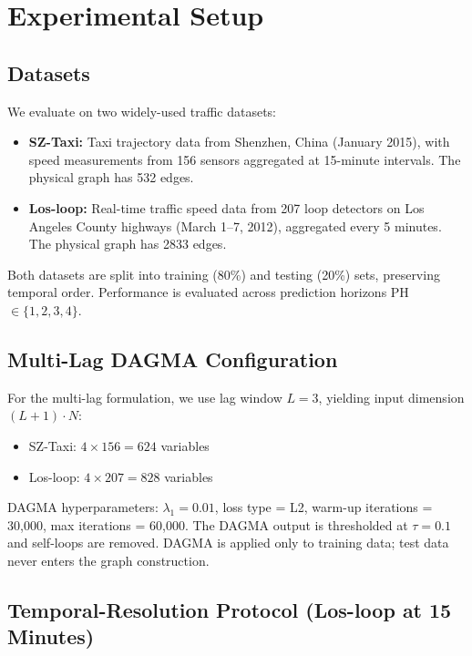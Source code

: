 \section{Experimental Setup}\label{sec:experiments}

\subsection{Datasets}

We evaluate on two widely-used traffic datasets:

\begin{itemize}
    \item \textbf{SZ-Taxi:} Taxi trajectory data from Shenzhen, China (January 2015), with speed measurements from 156 sensors aggregated at 15-minute intervals. The physical graph has 532 edges.
    \item \textbf{Los-loop:} Real-time traffic speed data from 207 loop detectors on Los Angeles County highways (March 1--7, 2012), aggregated every 5 minutes. The physical graph has 2833 edges.
\end{itemize}

Both datasets are split into training (80\%) and testing (20\%) sets, preserving temporal order. Performance is evaluated across prediction horizons PH $\in \{1, 2, 3, 4\}$.

\subsection{Multi-Lag DAGMA Configuration}

For the multi-lag formulation, we use lag window $L=3$, yielding input dimension $(L+1) \cdot N$:
\begin{itemize}
    \item SZ-Taxi: $4 \times 156 = 624$ variables
    \item Los-loop: $4 \times 207 = 828$ variables
\end{itemize}

DAGMA hyperparameters: $\lambda_1 = 0.01$, loss type = L2, warm-up iterations = 30,000, max iterations = 60,000. The DAGMA output is thresholded at $\tau = 0.1$ and self-loops are removed. DAGMA is applied only to training data; test data never enters the graph construction.

\subsection{Temporal-Resolution Protocol (Los-loop at 15 Minutes)}

